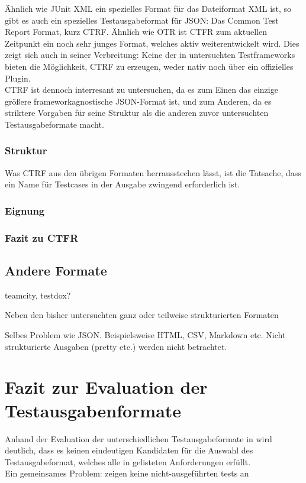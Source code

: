 Ähnlich wie JUnit XML ein spezielles Format für das Dateiformat XML ist, so gibt es auch ein spezielles Testausgabeformat für JSON: Das Common Test Report Format, kurz CTRF. Ähnlich wie OTR ist CTFR zum aktuellen Zeitpunkt ein noch sehr junges Format, welches aktiv weiterentwickelt wird. Dies zeigt sich auch in seiner Verbreitung: Keine der in  untersuchten Testframeworks bieten die Möglichkeit, CTRF zu erzeugen, weder nativ noch über ein offizielles Plugin.\\
CTRF ist dennoch interresant zu untersuchen, da es zum Einen das einzige größere frameworkagnostische JSON-Format ist, und zum Anderen, da es striktere Vorgaben für seine Struktur als die anderen zuvor untersuchten Testausgabeformate macht.

\subsubsection{Struktur}
Was CTRF aus den übrigen Formaten herrausstechen lässt, ist die Tatsache, dass ein Name für Testcases in der Ausgabe zwingend erforderlich ist. 

\subsubsection{Eignung}

\subsubsection{Fazit zu CTFR}

\subsection{Andere Formate}
teamcity, testdox?

Neben den bisher untersuchten ganz oder teilweise strukturierten Formaten 

Selbes Problem wie JSON. Beispielsweise HTML, CSV, Markdown etc. Nicht strukturierte Ausgaben (pretty etc.) werden nicht betrachtet.


\section{Fazit zur Evaluation der Testausgabenformate}
Anhand der Evaluation der unterschiedlichen Testausgabeformate in  wird deutlich, dass es keinen eindeutigen Kandidaten für die Auswahl des Testausgabeformat, welches alle in  gelisteten Anforderungen erfüllt.\\
Ein gemeinsames Problem: zeigen keine nicht-ausgeführten tests an
